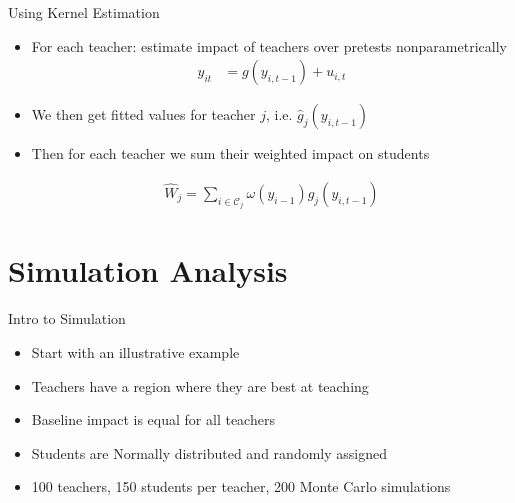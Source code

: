 \documentclass[t,aspectratio=169,11pt]{beamer}
\begin{document}
\begin{frame}{Using Kernel Estimation}

\begin{itemize}
    \item For each teacher: estimate impact of teachers over pretests nonparametrically
     \begin{align*}
    y_{it}  &= g(y_{i,t-1}) + u_{i,t}
    \end{align*}
\item We then get fitted values for teacher $j$, i.e.  $\hat{g}_j(y_{i,t-1})$
\item Then for each teacher we sum their weighted impact on students 

      \begin{align*}
    \hat{W}_j = \sum_{i \in \mathcal{C}_j} \omega(y_{i-1}) \hat{g}_j(y_{i,t-1})
    \end{align*}
    
\end{itemize}

 
\end{frame}



%



\section{Simulation Analysis}

\begin{frame}{Intro to Simulation}
\begin{itemize}
    \item Start with an illustrative example 
    \item Teachers have a region where they are best at teaching 
    \item Baseline impact is equal for all teachers 
    \item Students are Normally distributed and randomly assigned
    \item 100 teachers, 150 students per teacher, 200 Monte Carlo simulations 
\end{itemize}

\end{frame}
\end{document}

